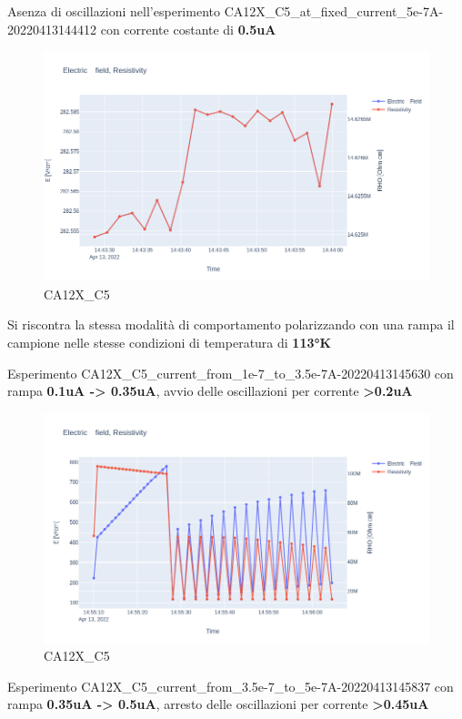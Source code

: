 \documentclass[11pt]{article}
\begin{document}
Asenza di oscillazioni nell'esperimento
CA12X\_C5\_at\_fixed\_current\_5e-7A-20220413144412 con corrente
costante di \textbf{0.5uA}

\begin{figure}
\centering
\includegraphics{CA12X_C5-5.png}
\caption{CA12X\_C5}
\end{figure}

Si riscontra la stessa modalità di comportamento polarizzando con una
rampa il campione nelle stesse condizioni di temperatura di
\textbf{113°K}

Esperimento CA12X\_C5\_current\_from\_1e-7\_to\_3.5e-7A-20220413145630
con rampa \textbf{0.1uA -\textgreater{} 0.35uA}, avvio delle
oscillazioni per corrente \textbf{\textgreater0.2uA}

\begin{figure}
\centering
\includegraphics{CA12X_C5-1-3_5.png}
\caption{CA12X\_C5}
\end{figure}

Esperimento CA12X\_C5\_current\_from\_3.5e-7\_to\_5e-7A-20220413145837
con rampa \textbf{0.35uA -\textgreater{} 0.5uA}, arresto delle
oscillazioni per corrente \textbf{\textgreater0.45uA}
\end{document}
